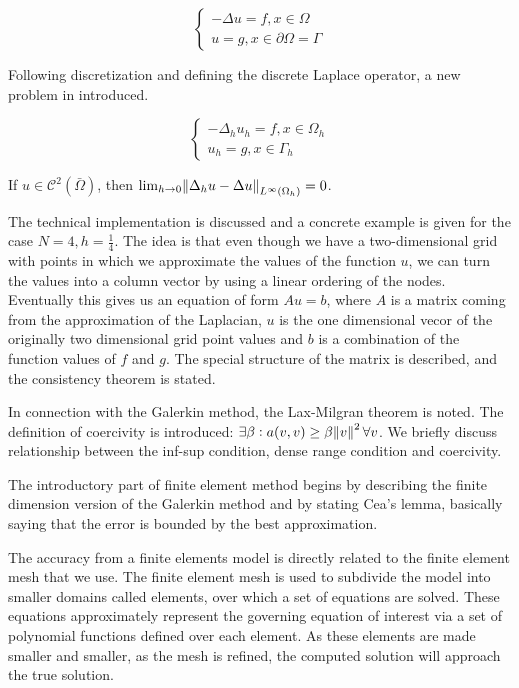 \documentclass{article}
\begin{document}
\begin{equation}
   \begin{cases}
               - \Delta u = f, x \in \Omega\\
               u = g, x \in \partial \Omega = \Gamma
   \end{cases}
\end{equation}

Following discretization and defining the discrete Laplace operator, a new problem in introduced.

\begin{equation}
   \begin{cases}
               - \Delta_h u_h = f, x \in \Omega_h\\
               u_h = g, x \in \Gamma_h
   \end{cases}
\end{equation}

If $u \in \mathcal{C}^2(\bar{\Omega})$, then $\lim_{h \to 0} \norm{\Delta_h u - \Delta u}_{L^{\infty} (\Omega_h)} = 0$.

The technical implementation is discussed and a concrete example is given for the case $N=4, h=\frac{1}{4}$. The idea is that even though we have a two-dimensional grid with points in which we approximate the values of the function $u$, we can turn the values into a column vector by using a linear ordering of the nodes. Eventually this gives us an equation of form $Au = b$, where $A$ is a matrix coming from the approximation of the Laplacian, $u$ is the one dimensional vecor of the originally two dimensional grid point values and $b$ is a combination of the function values of $f$ and $g$. The special structure of the matrix is described, and the consistency theorem is stated.

In connection with the Galerkin method, the Lax-Milgran theorem is noted. The definition of coercivity is introduced: $\exists \beta: a(v,v) \geq \beta \norm{v}^2 \forall v$. We briefly discuss relationship between the inf-sup condition, dense range condition and coercivity.

The introductory part of finite element method begins by describing the finite dimension version of the Galerkin method and by stating Cea's lemma, basically saying that the error is bounded by the best approximation.

The accuracy from a finite elements model is directly related to the finite element mesh that we use. The finite element mesh is used to subdivide the model into smaller domains called elements, over which a set of equations are solved. These equations approximately represent the governing equation of interest via a set of polynomial functions defined over each element. As these elements are made smaller and smaller, as the mesh is refined, the computed solution will approach the true solution.
\end{document}
